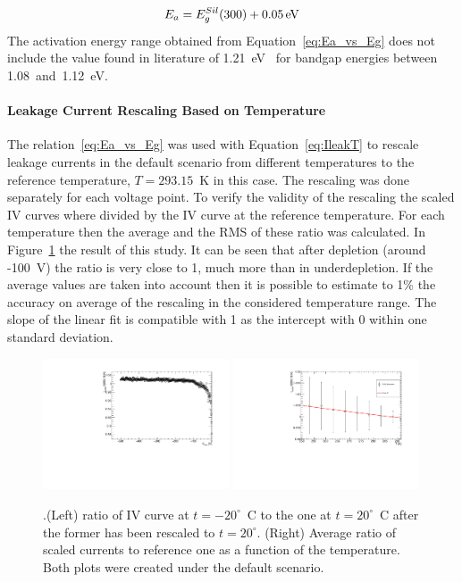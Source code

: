 \begin{equation}
E_a=E^{Sil}_g(300)+0.05\,{\rm eV}
\label{eq:Ea_vs_Eg}
\end{equation}
The activation energy range obtained from Equation~\ref{eq:Ea_vs_Eg} does not include 
the value found in literature of 1.21~eV~\cite{Chilingarov_tscale} for bandgap energies between 
1.08~and~1.12~eV.

\paragraph{Leakage Current Rescaling Based on Temperature}

The relation~\ref{eq:Ea_vs_Eg} was  used with Equation~\ref{eq:IleakT} to rescale 
leakage currents in the default scenario 
from different temperatures to the reference temperature, $T=293.15$~K 
in this case. The rescaling was done separately for each voltage point. 
 To verify the validity of the rescaling the scaled IV curves 
where divided by the IV curve at the reference temperature. For each 
temperature then the average and the RMS  of these ratio was calculated. 
In Figure~\ref{fig:scaling} the result of this study. It can be seen that after depletion (around -100~V) 
the ratio is very close to 1, much more than in underdepletion. 
If the average values are taken into account then it is possible to estimate to 1\% the accuracy 
on average of the rescaling in the considered temperature range. The slope of the linear fit 
is compatible with 1 as the intercept with 0 within one standard deviation.



\begin{figure}[!htbp]
\centering
\includegraphics[width=0.49\textwidth]{default/scaled_ratio_T-20.pdf}
\includegraphics[width=0.49\textwidth]{default/scaling.pdf}
\caption{\label{fig:scaling}.(Left) ratio of IV curve at $t=-20^{\circ}$~C to the one at $t=20^{\circ}$~C 
after the former has been rescaled to $t=20^{\circ}$. (Right) Average ratio of scaled currents to reference one as a function of the temperature. Both plots were created under the default scenario.}
\end{figure}

